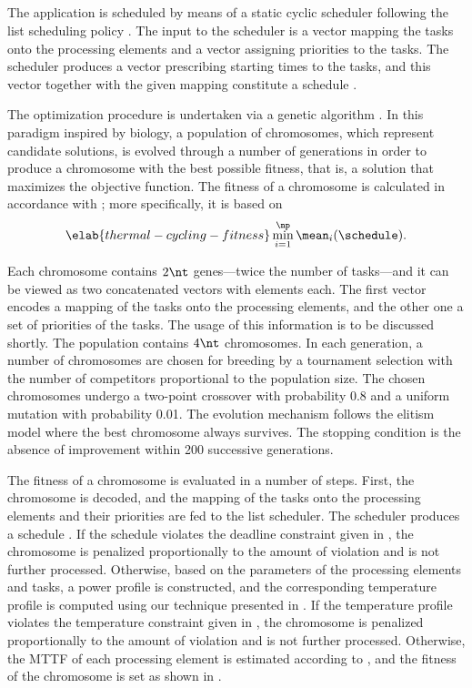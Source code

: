 \subsection{\solutiontitle}

The application is scheduled by means of a static cyclic scheduler following the
list scheduling policy \cite{adam1974}. The input to the scheduler is a vector
mapping the tasks onto the processing elements and a vector assigning priorities
to the tasks. The scheduler produces a vector prescribing starting times to the
tasks, and this vector together with the given mapping constitute a schedule
\schedule.

The optimization procedure is undertaken via a genetic algorithm
\cite{schmitz2004}. In this paradigm inspired by biology, a population of
chromosomes, which represent candidate solutions, is evolved through a number of
generations in order to produce a chromosome with the best possible fitness,
that is, a solution that maximizes the objective function. The fitness of a
chromosome is calculated in accordance with ;
more specifically, it is based on
\begin{equation} \elab{thermal-cycling-fitness}
  \min_{i = 1}^\np \mean_i(\schedule).
\end{equation}

Each chromosome contains $2 \nt$ genes---twice the number of tasks---and it can
be viewed as two concatenated vectors with \nt elements each. The first vector
encodes a mapping of the tasks onto the processing elements, and the other one a
set of priorities of the tasks. The usage of this information is to be discussed
shortly. The population contains $4 \nt$ chromosomes. In each generation, a
number of chromosomes are chosen for breeding by a tournament selection with the
number of competitors proportional to the population size. The chosen
chromosomes undergo a two-point crossover with probability 0.8 and a uniform
mutation with probability 0.01. The evolution mechanism follows the elitism
model where the best chromosome always survives. The stopping condition is the
absence of improvement within 200 successive generations.

The fitness of a chromosome is evaluated in a number of steps. First, the
chromosome is decoded, and the mapping of the tasks onto the processing elements
and their priorities are fed to the list scheduler. The scheduler produces a
schedule \schedule. If the schedule violates the deadline constraint given in
, the chromosome is penalized proportionally
to the amount of violation and is not further processed. Otherwise, based on the
parameters of the processing elements and tasks, a power profile \mp is
constructed, and the corresponding temperature profile \mq is computed using our
technique presented in . If the temperature
profile violates the temperature constraint given in
, the chromosome is penalized proportionally
to the amount of violation and is not further processed. Otherwise, the
\ac{MTTF} of each processing element is estimated according to
, and the fitness of the chromosome is set as
shown in .

